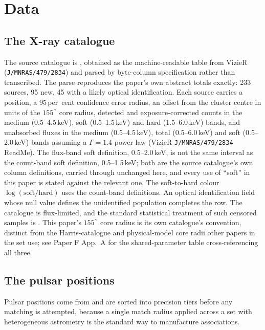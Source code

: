 \documentclass[11pt]{article}
\newcommand{\as}{\ensuremath{^{\prime\prime}}}
\begin{document}
\section{Data}
\label{sec:data}

\subsection{The X-ray catalogue}
\label{sec:data-xray}

The source catalogue is \citet{Henleywillis2018}, obtained as the machine-readable table from VizieR (\texttt{J/MNRAS/479/2834}) and parsed by byte-column specification rather than transcribed. The parse reproduces the paper's own abstract totals exactly: 233 sources, 95 new, 45 with a likely optical identification. Each source carries a position, a 95\,per~cent confidence error radius, an offset from the \citet{AndersonvanderMarel2010} cluster centre in units of the $155\as$ core radius, detected and exposure-corrected counts in the medium (0.5--4.5\,keV), soft (0.5--1.5\,keV) and hard (1.5--6.0\,keV) bands, and unabsorbed fluxes in the medium (0.5--4.5\,keV), total (0.5--6.0\,keV) and soft (0.5--2.0\,keV) bands assuming a $\Gamma=1.4$ power law (VizieR \texttt{J/MNRAS/479/2834} ReadMe). The flux-band soft definition, 0.5--2.0\,keV, is not the same interval as the count-band soft definition, 0.5--1.5\,keV; both are the source catalogue's own column definitions, carried through unchanged here, and every use of ``soft'' in this paper is stated against the relevant one. The soft-to-hard colour $\log(\mathrm{soft}/\mathrm{hard})$ uses the count-band definitions. An optical identification field whose null value defines the unidentified population completes the row. The catalogue is flux-limited, and the standard statistical treatment of such censored samples is \citet{FeigelsonNelson1985}. This paper's $155\as$ core radius is its own catalogue's convention, distinct from the Harris-catalogue and physical-model core radii other papers in the set use; see Paper F App.~A for the shared-parameter table cross-referencing all three.

\subsection{The pulsar positions}
\label{sec:data-psr}

Pulsar positions come from \citet{ColomiBernadich2026} and are sorted into precision tiers before any matching is attempted, because a single match radius applied across a set with heterogeneous astrometry is the standard way to manufacture associations.
\end{document}
